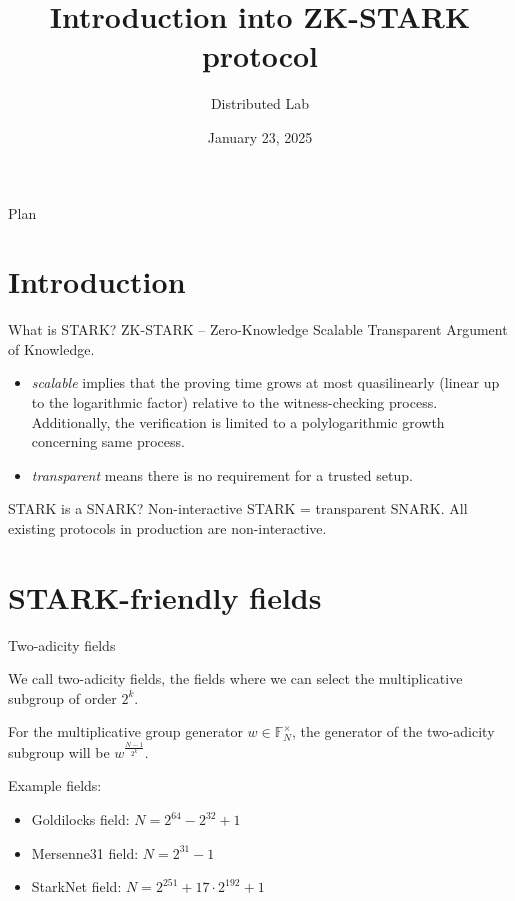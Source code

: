 \documentclass{zkdl-presentation-template}
\title[Introduction into ZK-STARK protocol]{\textbf{Introduction into ZK-STARK protocol}}
\author{Distributed Lab}
\date{January 23, 2025}
\begin{document}

\begin{frame}{Plan}
    \tableofcontents
\end{frame}

\section{Introduction}

\begin{frame}{What is STARK?}
    ZK-STARK -- Zero-Knowledge Scalable Transparent Argument of Knowledge.
    \begin{itemize}
        \item \textit{scalable} implies that the proving time grows at most quasilinearly (linear up to the logarithmic factor) relative to the witness-checking process. Additionally, the verification is limited to a polylogarithmic growth concerning same process.
        \item \textit{transparent} means there is no requirement for a trusted setup.
    \end{itemize}
\end{frame}

\begin{frame}{STARK is a SNARK?}
    Non-interactive STARK = transparent SNARK. All existing protocols in production are non-interactive.
\end{frame}

\section{STARK-friendly fields}

\begin{frame}{Two-adicity fields}
    \begin{definition}
        We call two-adicity fields, the fields where we can select the multiplicative subgroup of order $2^k$.
    \end{definition}

    For the multiplicative group generator $w \in \mathbb{F}_N^{\times}$, the generator of the two-adicity subgroup will be $w^\frac{N - 1}{2^k}$.

    Example fields:
    \begin{itemize}
        \item Goldilocks field: $N=2^{64} - 2^{32} + 1$
        \item Mersenne31 field: $N=2^{31} - 1$
        \item StarkNet field: $N=2^{251} + 17 \cdot 2^{192} + 1$
    \end{itemize}
\end{frame}
\end{document}
